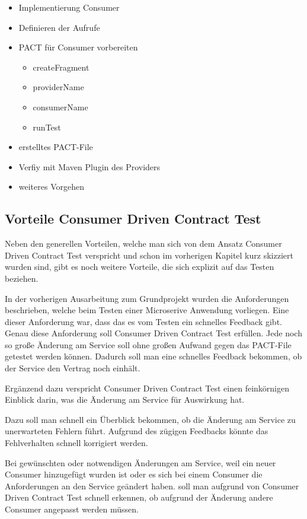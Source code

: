 \documentclass{llncs}
\begin{document}
\begin{itemize}
\item Implementierung Consumer
\item Definieren der Aufrufe
\item PACT für Consumer vorbereiten
\begin{itemize}
\item createFragment
\item providerName
\item consumerName
\item runTest
\end{itemize}
\item erstelltes PACT-File
\item Verfiy mit Maven Plugin des Providers
\item weiteres Vorgehen
\end{itemize}


\subsection{Vorteile Consumer Driven Contract Test}
Neben den generellen Vorteilen, welche man sich von dem Ansatz Consumer Driven Contract Test verspricht und schon im vorherigen Kapitel kurz skizziert wurden sind, gibt es noch weitere Vorteile, die sich explizit auf das Testen beziehen.

In der vorherigen Ausarbeitung zum Grundprojekt wurden die Anforderungen beschrieben, welche beim Testen einer Microserive Anwendung vorliegen. 
Eine dieser Anforderung war, dass das es vom Testen ein schnelles Feedback gibt. 
Genau diese Anforderung soll Consumer Driven Contract Test erfüllen. 
Jede noch so große Änderung am Service soll ohne großen Aufwand gegen das PACT-File getestet werden können. Dadurch soll man eine schnelles Feedback bekommen, ob der Service den Vertrag noch einhält.

Ergänzend dazu verspricht Consumer Driven Contract Test einen feinkörnigen Einblick darin, was die Änderung am Service für Auswirkung hat.

Dazu soll man schnell ein Überblick bekommen, ob die Änderung am Service zu unerwarteten Fehlern führt. Aufgrund des zügigen Feedbacks könnte das Fehlverhalten schnell korrigiert werden.

Bei gewünschten oder notwendigen Änderungen am Service, weil ein neuer Consumer hinzugefügt wurden ist oder es sich bei einem Consumer die Anforderungen an den Service geändert haben. soll man aufgrund von Consumer Driven Contract Test schnell erkennen, ob aufgrund der Änderung andere Consumer angepasst werden müssen. 
\end{document}
